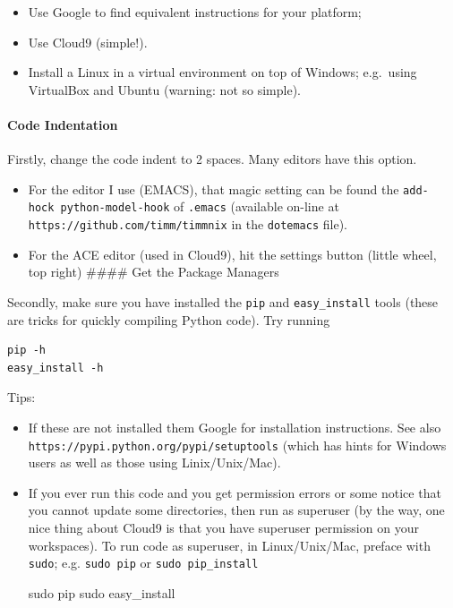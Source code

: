 \begin{itemize}
\itemsep1pt\parskip0pt
\item
  Use Google to find equivalent instructions for your platform;
\item
  Use Cloud9 (simple!).
\item
  Install a Linux in a virtual environment on top of Windows; e.g.~using
  VirtualBox and Ubuntu (warning: not so simple).
\end{itemize}

\paragraph{Code Indentation}\label{code-indentation}

Firstly, change the code indent to 2 spaces. Many editors have this
option.

\begin{itemize}
\itemsep1pt\parskip0pt
\item
  For the editor I use (EMACS), that magic setting can be found the
  \texttt{add-hock\ \textquotesingle{}python-model-hook} of
  \texttt{.emacs} (available on-line at
  \texttt{https://github.com/timm/timmnix} in the \texttt{dotemacs}
  file).
\item
  For the ACE editor (used in Cloud9), hit the settings button (little
  wheel, top right) \#\#\#\# Get the Package Managers
\end{itemize}

Secondly, make sure you have installed the \texttt{pip} and
\texttt{easy\_install} tools (these are tricks for quickly compiling
Python code). Try running

\begin{lstlisting}
pip -h
easy_install -h
\end{lstlisting}

Tips:

\begin{itemize}
\item
  If these are not installed them Google for installation instructions.
  See also \texttt{https://pypi.python.org/pypi/setuptools} (which has
  hints for Windows users as well as those using Linix/Unix/Mac).
\item
  If you ever run this code and you get permission errors or some notice
  that you cannot update some directories, then run as superuser (by the
  way, one nice thing about Cloud9 is that you have superuser permission
  on your workspaces). To run code as superuser, in Linux/Unix/Mac,
  preface with \texttt{sudo}; e.g. \texttt{sudo\ pip} or
  \texttt{sudo\ pip\_install}

  sudo pip sudo easy\_install
\end{itemize}


